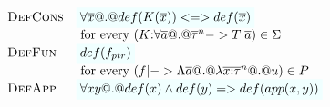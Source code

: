 \documentclass[preprint,nocopyrightspace,draft]{sigplanconf}
\begin{document}
\[\begin{array}{lll} 
 \textsc{DefCons} & \formula{\forall \xs @.@ \definable{K(\xs)} <=> \definable{\xs}} \\
                        & \text{ for every } (K{:}\forall\as @.@ \oln{\tau}{n} -> T\;\as) \in \Sigma \\
 \textsc{DefFun}  & \formula{\definable{f_{ptr}}}  \\
                        & \text{ for every } (f |-> \Lambda\as @.@ \lambda\oln{x{:}\tau}{n} @.@ u) \in P \\
 \textsc{DefApp}  & \formula{\forall x y @.@ \definable{x}\land\definable{y} => \definable{app(x,y)}}

\end{array}\]
\end{document}
